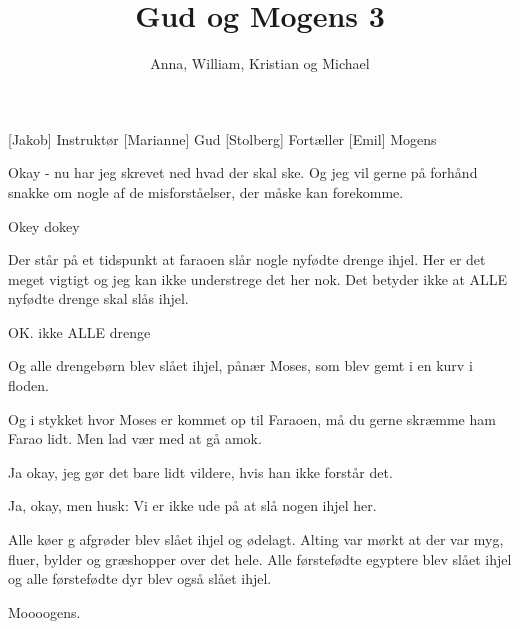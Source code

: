 \documentclass[a4paper,11pt]{article}
\title{Gud og Mogens 3}
\author{Anna, William, Kristian og Michael}
\begin{document}
\maketitle

\begin{roles}
[Jakob] Instruktør
[Marianne] Gud
[Stolberg] Fortæller
[Emil] Mogens
\end{roles}


  
\begin{sketch}


 Okay - nu har jeg skrevet ned hvad der skal ske. Og jeg vil gerne på forhånd snakke om nogle af de misforståelser, der måske kan forekomme.

 Okey dokey

 Der står på et tidspunkt at faraoen slår nogle nyfødte drenge ihjel. Her er det meget vigtigt og jeg kan ikke understrege det her nok. Det betyder ikke at ALLE nyfødte drenge skal slås ihjel.

 OK. ikke ALLE drenge 

  Og alle drengebørn blev slået ihjel, pånær Moses, som blev gemt i en kurv i floden.

 Og i stykket hvor Moses er kommet op til Faraoen, må du gerne skræmme ham Farao lidt. Men lad vær med at gå amok. 

  Ja okay, jeg gør det bare lidt vildere, hvis han ikke forstår det.

 Ja, okay, men husk: Vi er ikke ude på at slå nogen ihjel her.

 Alle køer g afgrøder blev slået ihjel og ødelagt. Alting var mørkt at der var myg, fluer, bylder og græshopper over det hele. Alle førstefødte egyptere blev slået ihjel og alle førstefødte dyr blev også slået ihjel.

 Moooogens.




\end{sketch}
\end{document}
